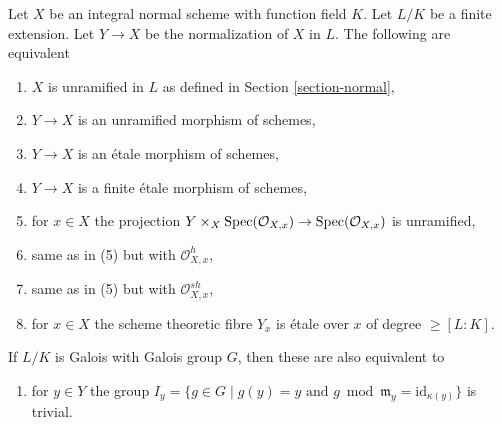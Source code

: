 \begin{lemma}
\label{lemma-unramified}
Let $X$ be an integral normal scheme with function field $K$.
Let $L/K$ be a finite extension. Let $Y \to X$ be the normalization
of $X$ in $L$. The following are equivalent
\begin{enumerate}
\item $X$ is unramified in $L$ as defined in Section \ref{section-normal},
\item $Y \to X$ is an unramified morphism of schemes,
\item $Y \to X$ is an \'etale morphism of schemes,
\item $Y \to X$ is a finite \'etale morphism of schemes,
\item for $x \in X$ the projection
$Y \times_X \mathop{\mathrm{Spec}}(\mathcal{O}_{X, x}) \to \mathop{\mathrm{Spec}}(\mathcal{O}_{X, x})$
is unramified,
\item same as in (5) but with $\mathcal{O}_{X, x}^h$,
\item same as in (5) but with $\mathcal{O}_{X, x}^{sh}$,
\item for $x \in X$ the scheme theoretic fibre $Y_x$
is \'etale over $x$ of degree $\geq [L : K]$.
\end{enumerate}
If $L/K$ is Galois with Galois group $G$, then these are also
equivalent to
\begin{enumerate}
\item[(9)] for $y \in Y$ the group
$I_y = \{g \in G \mid g(y) = y\text{ and }
g \bmod \mathfrak m_y = \text{id}_{\kappa(y)}\}$ is trivial.
\end{enumerate}
\end{lemma}

